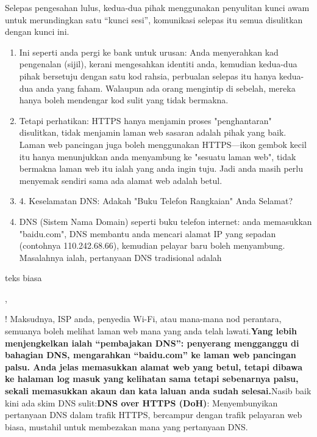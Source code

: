 
Selepas pengesahan lulus, kedua-dua pihak menggunakan penyulitan kunci awam untuk merundingkan satu “kunci sesi”, komunikasi selepas itu semua disulitkan dengan kunci ini.

\begin{enumerate}
  \item Ini seperti anda pergi ke bank untuk urusan: Anda menyerahkan kad pengenalan (sijil), kerani mengesahkan identiti anda, kemudian kedua-dua pihak bersetuju dengan satu kod rahsia, perbualan selepas itu hanya kedua-dua anda yang faham. Walaupun ada orang mengintip di sebelah, mereka hanya boleh mendengar kod sulit yang tidak bermakna.
  \item Tetapi perhatikan: HTTPS hanya menjamin proses "penghantaran" disulitkan, tidak menjamin laman web sasaran adalah pihak yang baik. Laman web pancingan juga boleh menggunakan HTTPS—ikon gembok kecil itu hanya menunjukkan anda menyambung ke "sesuatu laman web", tidak bermakna laman web itu ialah yang anda ingin tuju. Jadi anda masih perlu menyemak sendiri sama ada alamat web adalah betul.
  \item 4. Keselamatan DNS: Adakah "Buku Telefon Rangkaian" Anda Selamat?
  \item DNS (Sistem Nama Domain) seperti buku telefon internet: anda memasukkan "baidu.com", DNS membantu anda mencari alamat IP yang sepadan (contohnya 110.242.68.66), kemudian pelayar baru boleh menyambung. Masalahnya ialah, pertanyaan DNS tradisional adalah
\end{enumerate}

teks biasa

,


! Maksudnya, ISP anda, penyedia Wi-Fi, atau mana-mana nod perantara, semuanya boleh melihat laman web mana yang anda telah lawati.\textbf{Yang lebih menjengkelkan ialah “pembajakan DNS”: penyerang mengganggu di bahagian DNS, mengarahkan “baidu.com” ke laman web pancingan palsu. Anda jelas memasukkan alamat web yang betul, tetapi dibawa ke halaman log masuk yang kelihatan sama tetapi sebenarnya palsu, sekali memasukkan akaun dan kata laluan anda sudah selesai.}Nasib baik kini ada skim DNS sulit:\textbf{DNS over HTTPS (DoH)}: Menyembunyikan pertanyaan DNS dalam trafik HTTPS, bercampur dengan trafik pelayaran web biasa, mustahil untuk membezakan mana yang pertanyaan DNS.

